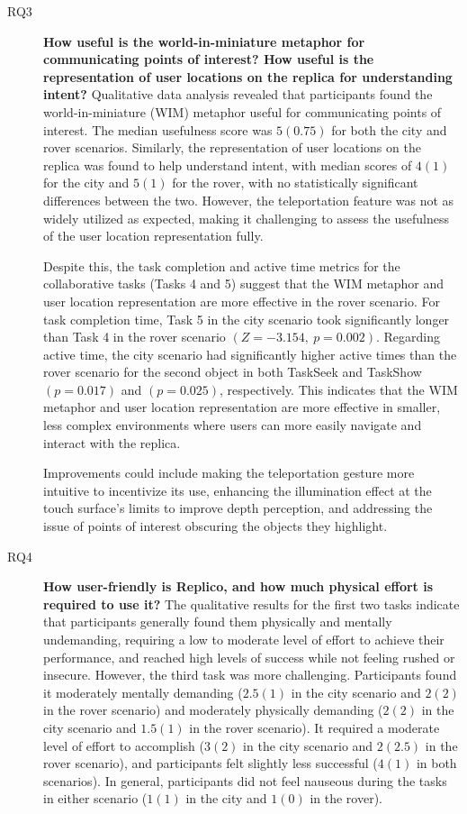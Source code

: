\begin{description}
            \item[RQ3] \textbf{How useful is the world-in-miniature metaphor for communicating points of interest? How useful is the representation of user locations on the replica for understanding intent?} Qualitative data analysis revealed that participants found the world-in-miniature (WIM) metaphor useful for communicating points of interest. The median usefulness score was $5 (0.75)$ for both the city and rover scenarios. Similarly, the representation of user locations on the replica was found to help understand intent, with median scores of $4 (1)$ for the city and $5 (1)$ for the rover, with no statistically significant differences between the two. However, the teleportation feature was not as widely utilized as expected, making it challenging to assess the usefulness of the user location representation fully. 
                       
            Despite this, the task completion and active time metrics for the collaborative tasks (Tasks 4 and 5) suggest that the WIM metaphor and user location representation are more effective in the rover scenario. For task completion time, Task 5 in the city scenario took significantly longer than Task 4 in the rover scenario $\left(Z = -3.154,\ p = 0.002\right)$. Regarding active time, the city scenario had significantly higher active times than the rover scenario for the second object in both TaskSeek and TaskShow $\left(p = 0.017\right)$ and $\left(p = 0.025\right)$, respectively. This indicates that the WIM metaphor and user location representation are more effective in smaller, less complex environments where users can more easily navigate and interact with the replica.

            Improvements could include making the teleportation gesture more intuitive to incentivize its use, enhancing the illumination effect at the touch surface's limits to improve depth perception, and addressing the issue of points of interest obscuring the objects they highlight.

            \item[RQ4] \textbf{How user-friendly is Replico, and how much physical effort is required to use it?} The qualitative results for the first two tasks indicate that participants generally found them physically and mentally undemanding, requiring a low to moderate level of effort to achieve their performance, and reached high levels of success while not feeling rushed or insecure. However, the third task was more challenging. Participants found it moderately mentally demanding ($2.5(1)$ in the city scenario and $2(2)$ in the rover scenario) and moderately physically demanding ($2(2)$ in the city scenario and $1.5(1)$ in the rover scenario). It required a moderate level of effort to accomplish ($3(2)$ in the city scenario and $2(2.5)$ in the rover scenario), and participants felt slightly less successful ($4(1)$ in both scenarios). In general, participants did not feel nauseous during the tasks in either scenario ($1(1)$ in the city and $1(0)$ in the rover).


\end{description}
